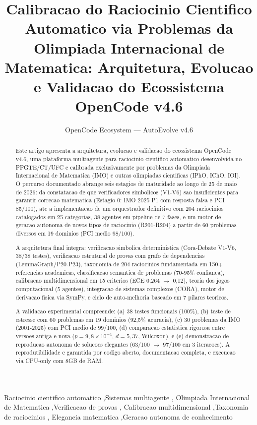 \documentclass[5p]{elsarticle}
\begin{document}
\begin{frontmatter}
\title{Calibracao do Raciocinio Cientifico Automatico via Problemas da Olimpiada Internacional de Matematica: Arquitetura, Evolucao e Validacao do Ecossistema OpenCode v4.6}
\author[ufc]{OpenCode Ecosystem --- AutoEvolve v4.6}
\address[ufc]{Programa de Pos-Graduacao em Tecnologia da Informacao, Universidade Federal do Ceara, Fortaleza, CE, Brasil}

\begin{abstract}
Este artigo apresenta a arquitetura, evolucao e validacao do ecossistema OpenCode
v4.6, uma plataforma multiagente para raciocinio cientifico automatico desenvolvida
no PPGTE/CT/UFC e calibrada exclusivamente por problemas da Olimpiada Internacional
de Matematica (IMO) e outras olimpiadas cientificas (IPhO, IChO, IOI). O percurso
documentado abrange seis estagios de maturidade ao longo de 25 de maio de 2026:
da constatacao de que verificadores simbolicos (V1-V6) sao insuficientes para
garantir correcao matematica (Estagio 0: IMO 2025 P1 com resposta falsa e PCI
85/100), ate a implementacao de um orquestrador definitivo com 204 raciocinios
catalogados em 25 categorias, 38 agentes em pipeline de 7 fases, e um motor de
geracao autonoma de novos tipos de raciocinio (R201-R204) a partir de 60 problemas
diversos em 19 dominios (PCI medio 98/100).

A arquitetura final integra: verificacao simbolica deterministica (Cora-Debate
V1-V6, 38/38 testes), verificacao estrutural de provas com grafo de dependencias
(LemmaGraph/P20-P23), taxonomia de 204 raciocinios fundamentada em 150+ referencias
academicas, classificacao semantica de problemas (70-95\% confianca), calibracao
multidimensional em 15 criterios (ECE 0,264 $\to$ 0,12), teoria dos jogos
computacional (5 agentes), integracao de sistemas complexos (CORA), motor de
derivacao fisica via SymPy, e ciclo de auto-melhoria baseado em 7 pilares teoricos.

A validacao experimental compreende: (a) 38 testes funcionais (100\%), (b) teste
de estresse com 60 problemas em 19 dominios (92,5\% acuracia), (c) 30 problemas
da IMO (2001-2025) com PCI medio de 99/100, (d) comparacao estatistica rigorosa
entre versoes antiga e nova ($p=9,8\times10^{-4}$, $d=5,37$, Wilcoxon), e
(e) demonstracao de reproducao autonoma de solucoes elegantes (63/100 $\to$ 97/100
em 3 iteracoes). A reprodutibilidade e garantida por codigo aberto, documentacao
completa, e execucao via CPU-only com 8GB de RAM.
\end{abstract}

\begin{keyword}
Raciocinio cientifico automatico \sep Sistemas multiagente \sep
Olimpiada Internacional de Matematica \sep Verificacao de provas \sep
Calibracao multidimensional \sep Taxonomia de raciocinios \sep
Elegancia matematica \sep Geracao autonoma de conhecimento
\end{keyword}
\end{frontmatter}
\end{document}
